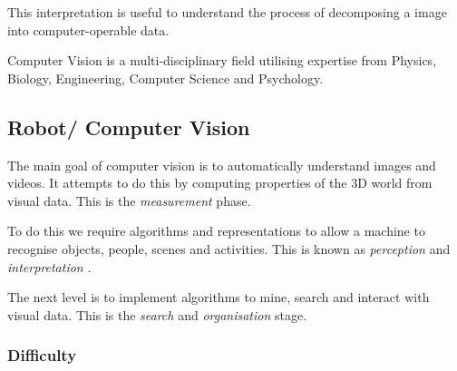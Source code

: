 \documentclass{article}
\begin{document}
\begin{center}
\end{center}

This interpretation is useful to understand the process of decomposing a image into computer-operable data.

Computer Vision is a multi-disciplinary field utilising expertise from Physics, Biology, Engineering, Computer Science and Psychology.

\subsection{Robot/ Computer Vision}

The main goal of computer vision is to automatically understand images and videos. It attempts to do this by computing properties of the 3D world from visual data. This is the \textit{measurement} phase.

To do this we require algorithms and representations to allow a machine to recognise objects, people, scenes and activities. This is known as \textit{perception} and \textit{interpretation} .

The next level is to implement algorithms to mine, search and interact with visual data. This is the \textit{search} and \textit{organisation} stage.

\subsubsection{Difficulty}
\end{document}

